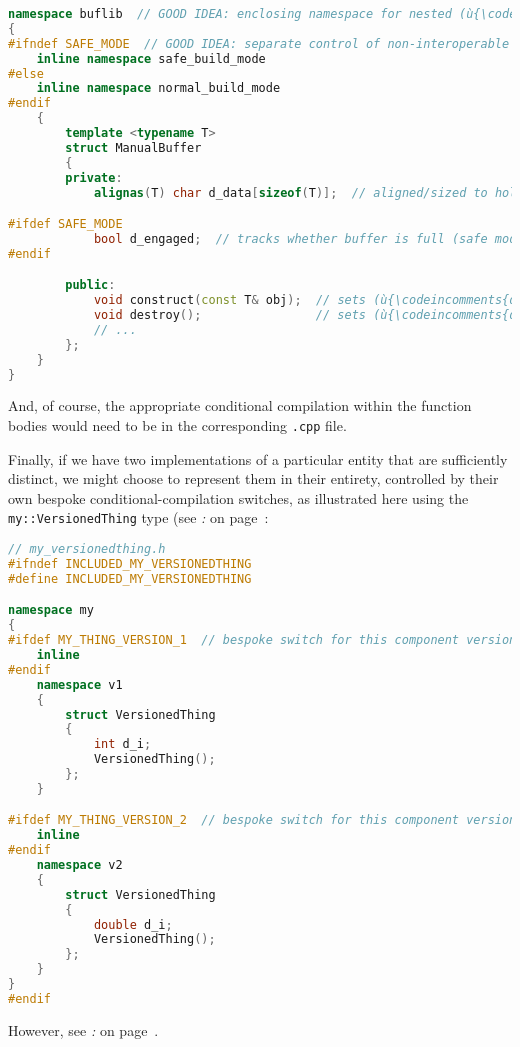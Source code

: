 \begin{lstlisting}[language=C++]
namespace buflib  // GOOD IDEA: enclosing namespace for nested (ù{\codeincomments{inline}}ù) namespace
{
#ifndef SAFE_MODE  // GOOD IDEA: separate control of non-interoperable versions
    inline namespace safe_build_mode
#else
    inline namespace normal_build_mode
#endif
    {
        template <typename T>
        struct ManualBuffer
        {
        private:
            alignas(T) char d_data[sizeof(T)];  // aligned/sized to hold a (ù{\codeincomments{T}}ù)

#ifdef SAFE_MODE
            bool d_engaged;  // tracks whether buffer is full (safe mode only)
#endif

        public:
            void construct(const T& obj);  // sets (ù{\codeincomments{d\_engaged}}ù) (safe mode only)
            void destroy();                // sets (ù{\codeincomments{d\_engaged}}ù) (safe mode only)
            // ...
        };
    }
}
\end{lstlisting}

\noindent And, of course, the appropriate conditional compilation within the
function bodies would need to be in the corresponding \texttt{.cpp}
file.

Finally, if we have two implementations of a particular entity that are
sufficiently distinct, we might choose to represent them in their
entirety, controlled by their own bespoke conditional-compilation
switches, as illustrated here using the \texttt{my::VersionedThing} type
(see \textit{: } on page~\pageref{link-safe-abi-versioning}:

\begin{lstlisting}[language=C++]
// my_versionedthing.h
#ifndef INCLUDED_MY_VERSIONEDTHING
#define INCLUDED_MY_VERSIONEDTHING

namespace my
{
#ifdef MY_THING_VERSION_1  // bespoke switch for this component version
    inline
#endif
    namespace v1
    {
        struct VersionedThing
        {
            int d_i;
            VersionedThing();
        };
    }

#ifdef MY_THING_VERSION_2  // bespoke switch for this component version
    inline
#endif
    namespace v2
    {
        struct VersionedThing
        {
            double d_i;
            VersionedThing();
        };
    }
}
#endif
\end{lstlisting}

\noindent However, see \textit{: } on page~\pageref{inline-namespace-based-versioning-doesn’t-scale}.

